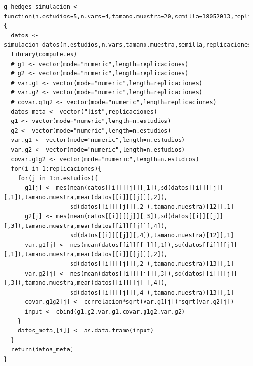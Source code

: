 \documentclass[a4paper,openright,12pt]{report}
\begin{document}
{\begin{verbatim}
g_hedges_simulacion <- function(n.estudios=5,n.vars=4,tamano.muestra=20,semilla=18052013,replicaciones=5,correlacion=0){
  datos <- simulacion_datos(n.estudios,n.vars,tamano.muestra,semilla,replicaciones)
  library(compute.es)
  # g1 <- vector(mode="numeric",length=replicaciones)
  # g2 <- vector(mode="numeric",length=replicaciones)
  # var.g1 <- vector(mode="numeric",length=replicaciones)
  # var.g2 <- vector(mode="numeric",length=replicaciones)
  # covar.g1g2 <- vector(mode="numeric",length=replicaciones) 
  datos_meta <- vector("list",replicaciones)
  g1 <- vector(mode="numeric",length=n.estudios)
  g2 <- vector(mode="numeric",length=n.estudios)
  var.g1 <- vector(mode="numeric",length=n.estudios)
  var.g2 <- vector(mode="numeric",length=n.estudios)
  covar.g1g2 <- vector(mode="numeric",length=n.estudios) 
  for(i in 1:replicaciones){
    for(j in 1:n.estudios){
      g1[j] <- mes(mean(datos[[i]][[j]][,1]),sd(datos[[i]][[j]][,1]),tamano.muestra,mean(datos[[i]][[j]][,2]),
                   sd(datos[[i]][[j]][,2]),tamano.muestra)[12][,1]
      g2[j] <- mes(mean(datos[[i]][[j]][,3]),sd(datos[[i]][[j]][,3]),tamano.muestra,mean(datos[[i]][[j]][,4]),
                   sd(datos[[i]][[j]][,4]),tamano.muestra)[12][,1]
      var.g1[j] <- mes(mean(datos[[i]][[j]][,1]),sd(datos[[i]][[j]][,1]),tamano.muestra,mean(datos[[i]][[j]][,2]),
                   sd(datos[[i]][[j]][,2]),tamano.muestra)[13][,1]
      var.g2[j] <- mes(mean(datos[[i]][[j]][,3]),sd(datos[[i]][[j]][,3]),tamano.muestra,mean(datos[[i]][[j]][,4]),
                   sd(datos[[i]][[j]][,4]),tamano.muestra)[13][,1]
      covar.g1g2[j] <- correlacion*sqrt(var.g1[j])*sqrt(var.g2[j])
      input <- cbind(g1,g2,var.g1,covar.g1g2,var.g2)
    }
    datos_meta[[i]] <- as.data.frame(input)
  }
  return(datos_meta)
}

\end{verbatim}}
\newpage
\end{document}
